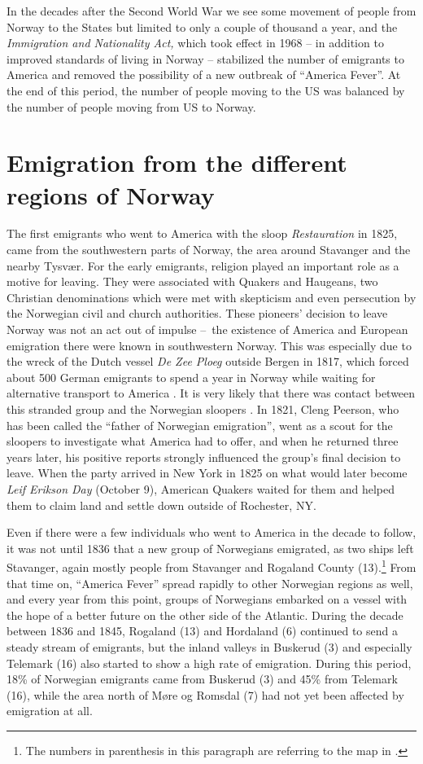 \documentclass[output=paper]{langscibook}
\begin{document}
In the decades after the Second World War we see some movement of people from Norway to the States but limited to only a couple of thousand a year, and the \textit{Immigration and Nationality Act,} which took effect in 1968 – in addition to improved standards of living in Norway – stabilized the number of emigrants to America and removed the possibility of a new outbreak of “America Fever”. At the end of this period, the number of people moving to the US was balanced by the number of people moving from US to Norway.

\section{Emigration from the different regions of Norway}\label{sec:hjelde:3}
\largerpage
The first emigrants who went to America with the sloop \textit{Restauration} in 1825, came from the southwestern parts of Norway, the area around Stavanger and the nearby Tysvær. For the early emigrants, religion played an important role as a motive for leaving. They were associated with Quakers and Haugeans, two Christian denominations which were met with skepticism and even persecution by the Norwegian civil and church authorities. These pioneers’ decision to leave Norway was not an act out of impulse –~the existence of America and European emigration there were known in southwestern Norway.  This was especially due to the wreck of the Dutch vessel \textit{De Zee Ploeg} outside Bergen in 1817, which forced about 500 German emigrants to spend a year in Norway while waiting for alternative transport to America \citep{Rieber-Mohn2014}. It is very likely that there was contact between this stranded group and the Norwegian sloopers \citep[136]{Semmingsen1976}. In 1821, Cleng Peerson, who has been called the “father of Norwegian emigration”, went as a scout for the sloopers to investigate what America had to offer, and when he returned three years later, his positive reports strongly influenced the group’s final decision to leave. When the party arrived in New York in 1825 on what would later become \textit{Leif Erikson Day} (October 9), American Quakers waited for them and helped them to claim land and settle down outside of Rochester, NY.
\largerpage

Even if there were a few individuals who went to America in the decade to follow, it was not until 1836 that a new group of Norwegians emigrated, as two ships left Stavanger, again mostly people from Stavanger and Rogaland County (13).\footnote{The numbers in parenthesis in this paragraph are referring to the map in .} From that time on, “America Fever” spread rapidly to other Norwegian regions as well, and every year from this point, groups of Norwegians embarked on a vessel with the hope of a better future on the other side of the Atlantic. During the decade between 1836 and 1845, Rogaland (13) and Hordaland (6) continued to send a steady stream of emigrants, but the inland valleys in Buskerud (3) and especially Telemark (16) also started to show a high rate of emigration. During this period, 18\% of Norwegian emigrants came from Buskerud (3) and 45\% from Telemark (16), while the area north of Møre og Romsdal (7) had not yet been affected by emigration at all. 
\end{document}
